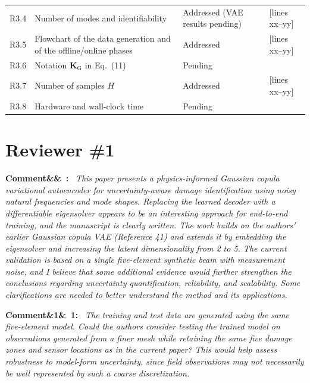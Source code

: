 \documentclass[11pt]{article}
\newenvironment{rcomment}[1]{\par\bigskip\noindent\textbf{Comment\ifx&#1&\else\ #1\fi:}\ \itshape}{\par}
\newcommand{\tbd}[1]{\textcolor{note}{\textsf{[#1]}}}
\newcommand{\lines}[1]{\tbd{lines #1}}
\begin{document}
{\begin{longtable}{p{1.55cm}p{6.0cm}p{3.0cm}p{3.6cm}}
R3.4 & Number of modes and identifiability & Addressed (VAE results pending) & \lines{xx--yy} \\
R3.5 & Flowchart of the data generation and of the offline/online phases & Addressed & \lines{xx--yy} \\
R3.6 & Notation $\mathbf{K}_{\mathrm{G}}$ in Eq.~(11) & Pending & \\
R3.7 & Number of samples $H$ & Addressed & \lines{xx--yy} \\
R3.8 & Hardware and wall-clock time & Pending & \\
\bottomrule
\end{longtable}
}

\section{Reviewer \#1}

\begin{rcomment}{}
This paper presents a physics-informed Gaussian copula variational autoencoder for uncertainty-aware damage
identification using noisy natural frequencies and mode shapes. Replacing the learned decoder with a differentiable
eigensolver appears to be an interesting approach for end-to-end training, and the manuscript is clearly written. The work
builds on the authors' earlier Gaussian copula VAE (Reference 41) and extends it by embedding the eigensolver and
increasing the latent dimensionality from 2 to 5. The current validation is based on a single five-element synthetic
beam with measurement noise, and I believe that some additional evidence would further strengthen the conclusions
regarding uncertainty quantification, reliability, and scalability. Some clarifications are needed to better understand
the method and its applications.
\end{rcomment}

\begin{rcomment}{1}
The training and test data are generated using the same five-element model. Could the authors consider testing the trained model on observations generated from a finer mesh while retaining the same five damage zones and sensor locations as in the current paper? This would help assess robustness to model-form uncertainty, since field observations
may not necessarily be well represented by such a coarse discretization.
\end{rcomment}
\end{document}
